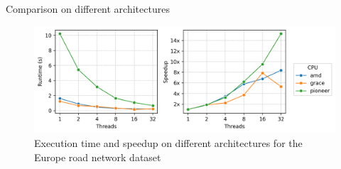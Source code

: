 \begin{frame}{Comparison on different architectures}
\centering
\begin{minipage}{0.8\linewidth}
\begin{figure}
  \includegraphics[width=\textwidth]{images/other_platforms.png}
  \caption{\centering Execution time and speedup on different architectures for the Europe road network dataset}
\end{figure}
\end{minipage}
\end{frame}